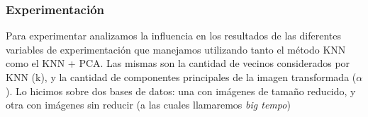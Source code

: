 \subsubsection*{Experimentación}
Para experimentar analizamos la influencia en los resultados de las diferentes variables de experimentación que manejamos utilizando tanto el método KNN como el KNN + PCA. 
Las mismas son la cantidad de vecinos considerados por KNN (k), y la cantidad de componentes principales de la imagen transformada ($\alpha$).
Lo hicimos sobre dos bases de datos: una con im\'agenes de tamaño reducido, y otra con imágenes sin reducir (a las cuales llamaremos \textit{big tempo})






